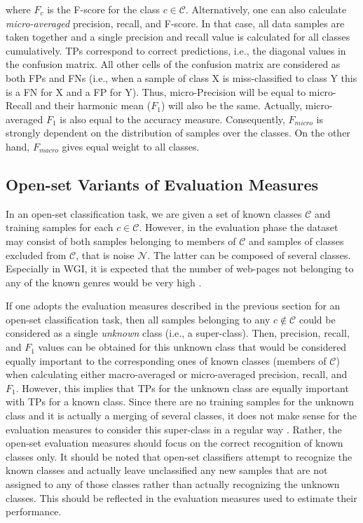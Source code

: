 \noindent 
where $F_c$ is the F-score for the class $c \in \mathcal{C}$. Alternatively, one can also calculate \textit{micro-averaged} precision, recall, and F-score. In that case, all data samples are taken together and a single precision and recall value is calculated for all classes cumulatively. TPs correspond to correct predictions, i.e., the diagonal values in the confusion matrix.  All other cells of the confusion matrix are considered as both FPs and FNs (i.e., when a sample of class X is miss-classified to class Y this is a FN for X and a FP for Y). Thus, micro-Precision will be equal to micro-Recall and their harmonic mean  ($F_{1}$) will also be the same. Actually, micro-averaged $F_{1}$ is also equal to the accuracy measure. Consequently, $F_{micro}$ is strongly dependent on the distribution of samples over the classes. On the other hand, $F_{macro}$ gives equal weight to all classes.

\subsection{Open-set Variants of Evaluation Measures}\label{chap:eval_methods:sec:openset_measures}

In an open-set classification task, we are given a set of known classes $\mathcal{C}$ and training samples for each $c \in \mathcal{C}$. However, in the evaluation phase the dataset may consist of both samples belonging to members of $\mathcal{C}$ and samples of classes excluded from $\mathcal{C}$, that is noise $\mathcal{N}$. The latter can be composed of several classes. Especially in WGI, it is expected that the number of web-pages not belonging to any of the known genres would be very high . 

If one adopts the evaluation measures described in the previous section for an open-set classification task, then all samples belonging to any $c \notin \mathcal{C}$ could be considered as a single \textit{unknown} class (i.e., a super-class). Then, precision, recall, and $F_{1}$ values can be obtained for this unknown class that would be considered equally important to the corresponding ones of known classes (members of $\mathcal{C}$) when calculating either macro-averaged or micro-averaged precision, recall, and $F_{1}$. However, this implies that TPs for the unknown class are equally important with TPs for a known class. Since there are no training samples for the unknown class and it is actually a merging of several classes, it does not make sense for the evaluation measures to consider this super-class in a  regular way \parencite{mendesjunior2016}. Rather, the open-set evaluation measures should focus on the correct recognition of known classes only. It should be noted that open-set classifiers attempt to recognize the known classes and actually leave unclassified any new samples that are not assigned to any of those classes rather than actually recognizing the unknown classes. This should be reflected in the evaluation measures used to estimate their performance. 

